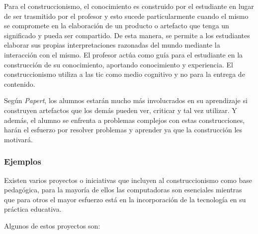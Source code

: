 Para el construccionismo, el conocimiento es construido por el estudiante en
lugar de ser trasmitido por el profesor\cite{moses:2003} y esto sucede
particularmente cuando el mismo se compromete en la elaboración de un producto o
artefacto que tenga un significado y pueda ser compartido\cite{valdivia:sg}. De
esta manera, se permite a los estudiantes elaborar sus propias interpretaciones
razonadas del mundo mediante la interacción con el mismo. El profesor actúa como
guía para el estudiante en la construcción de su conocimiento, aportando
conocimiento y experiencia. El construccionismo utiliza a las \gls{tic} como
medio cognitivo y no para la entrega de contenido\cite{sasha:construtivism}.

Según \textit{Papert}, los alumnos estarán mucho más involucrados en su aprendizaje si
construyen artefactos que los demás pueden ver, criticar y tal vez utilizar. Y
además, el alumno se enfrenta a problemas complejos con estas construcciones,
harán el esfuerzo por resolver problemas y aprender ya que la construcción les
motivará\cite{const:vs}.

\subsubsection{Ejemplos} 

Existen varios proyectos o iniciativas que incluyen al construccionismo como
base pedagógica, para la mayoría de ellos las computadoras son esenciales
mientras que para otros el mayor esfuerzo está en la incorporación de la
tecnología en su práctica educativa\cite{papertian:const}.

Algunos de estos proyectos son:


